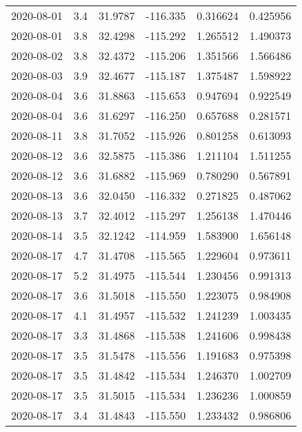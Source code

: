 \begin{tabular}{lrrrrr}
2020-08-01 &       3.4 &  31.9787 &  -116.335 &         0.316624 &         0.425956 \\
2020-08-01 &       3.8 &  32.4298 &  -115.292 &         1.265512 &         1.490373 \\
2020-08-02 &       3.8 &  32.4372 &  -115.206 &         1.351566 &         1.566486 \\
2020-08-03 &       3.9 &  32.4677 &  -115.187 &         1.375487 &         1.598922 \\
2020-08-04 &       3.6 &  31.8863 &  -115.653 &         0.947694 &         0.922549 \\
2020-08-04 &       3.6 &  31.6297 &  -116.250 &         0.657688 &         0.281571 \\
2020-08-11 &       3.8 &  31.7052 &  -115.926 &         0.801258 &         0.613093 \\
2020-08-12 &       3.6 &  32.5875 &  -115.386 &         1.211104 &         1.511255 \\
2020-08-12 &       3.6 &  31.6882 &  -115.969 &         0.780290 &         0.567891 \\
2020-08-13 &       3.6 &  32.0450 &  -116.332 &         0.271825 &         0.487062 \\
2020-08-13 &       3.7 &  32.4012 &  -115.297 &         1.256138 &         1.470446 \\
2020-08-14 &       3.5 &  32.1242 &  -114.959 &         1.583900 &         1.656148 \\
2020-08-17 &       4.7 &  31.4708 &  -115.565 &         1.229604 &         0.973611 \\
2020-08-17 &       5.2 &  31.4975 &  -115.544 &         1.230456 &         0.991313 \\
2020-08-17 &       3.6 &  31.5018 &  -115.550 &         1.223075 &         0.984908 \\
2020-08-17 &       4.1 &  31.4957 &  -115.532 &         1.241239 &         1.003435 \\
2020-08-17 &       3.3 &  31.4868 &  -115.538 &         1.241606 &         0.998438 \\
2020-08-17 &       3.5 &  31.5478 &  -115.556 &         1.191683 &         0.975398 \\
2020-08-17 &       3.5 &  31.4842 &  -115.534 &         1.246370 &         1.002709 \\
2020-08-17 &       3.5 &  31.5015 &  -115.534 &         1.236236 &         1.000859 \\
2020-08-17 &       3.4 &  31.4843 &  -115.550 &         1.233432 &         0.986806 \\

\end{tabular}
